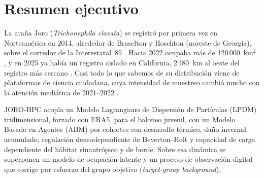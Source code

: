 \documentclass[11pt,letterpaper]{article}
\begin{document}
\section{Resumen ejecutivo}
La araña Joro (\textit{Trichonephila clavata}) se registró por primera vez en Norteamérica en 2014, alrededor de Braselton y Hoschton (noreste de Georgia), sobre el corredor de la Interestatal~85 \cite{hoebeke2015}. Hacia 2022 ocupaba más de 120\,000~km$^2$ \cite{chuang2023}, y en 2025 ya había un registro aislado en California, 2\,180~km al oeste del registro más cercano \cite{harman2025}. Casi todo lo que sabemos de su distribución viene de plataformas de ciencia ciudadana, cuya intensidad de muestreo cambió mucho con la atención mediática de 2021--2022 \cite{chuang2023,chuang2025}.

JORO-HPC acopla un Modelo Lagrangiano de Dispersión de Partículas (LPDM) tridimensional, forzado con ERA5, para el baloneo juvenil, con un Modelo Basado en Agentes (ABM) por cohortes con desarrollo térmico, daño invernal acumulado, regulación densodependiente de Beverton--Holt y capacidad de carga dependiente del hábitat sinantrópico y de borde. Sobre esa dinámica se superponen un modelo de ocupación latente y un proceso de observación digital que corrige por esfuerzo del grupo objetivo (\textit{target-group background}).
\end{document}
